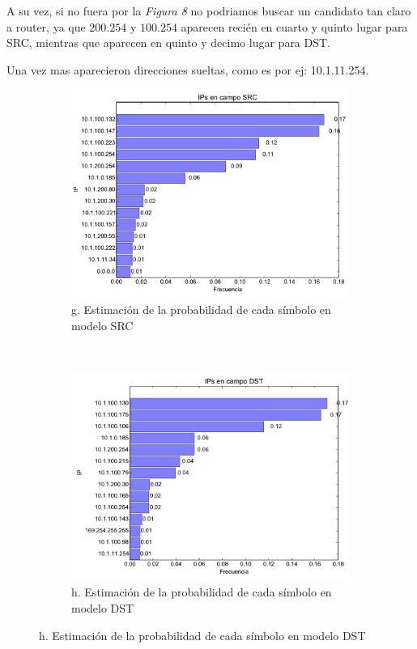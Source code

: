 A su vez, si no fuera por la \emph{Figura 8} no podriamos buscar un
candidato tan claro a router, ya que $200.254$ y $100.254$ aparecen reci\'en
en cuarto y quinto lugar para SRC, mientras que aparecen en quinto y decimo 
lugar para DST.

Una vez mas aparecieron direcciones sueltas, como es por ej: 10.1.11.254.

\begin{figure}[H]
	\center
	\begin{subfigure}{0.43\textwidth}
		\includegraphics[width=1.0\textwidth]{resultados/entrepiso/ipsSrc_4_25991830161.pdf}
		\caption{g. Estimaci\'on de la probabilidad de cada s\'imbolo en modelo SRC}
	\end{subfigure}
	~
	\begin{subfigure}{0.43\textwidth}
		\includegraphics[width=1.0\textwidth]{resultados/entrepiso/ipsDst_4_90633854055.pdf}
		\caption{h. Estimaci\'on de la probabilidad de cada s\'imbolo en modelo DST}
	\end{subfigure}
\end{figure}


